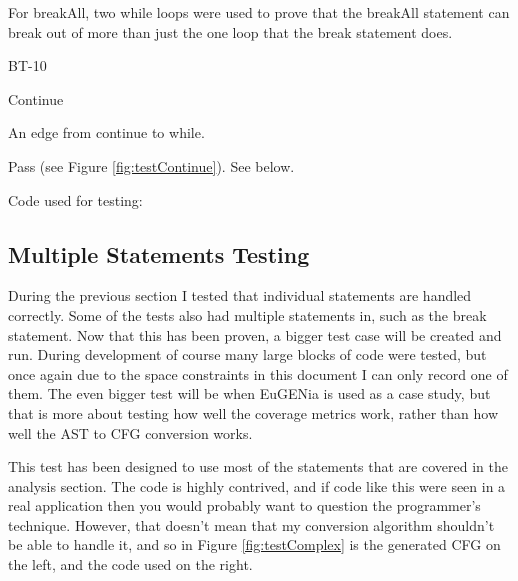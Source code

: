 For breakAll, two while loops were used to prove that the breakAll statement can break out of more than just the one loop that the break statement does.

\begin{minipage}{.6\textwidth}
\begin{description}[style=sameline,leftmargin=4.5cm,nolistsep]
\item[\hspace*{0.3cm}Label] BT-10
\item[\hspace*{0.3cm}Statement under Test] Continue
\item[\hspace*{0.3cm}Expected Output] An edge from continue to while.
\item[\hspace*{0.3cm}Result] Pass (see Figure \ref{fig:testContinue}). See below.
\end{description}
\end{minipage}
\begin{minipage}{.1\textwidth}
\hspace{1.0mm}
\end{minipage}
\begin{minipage}{.29\textwidth}
  \centering
  Code used for testing:
  
\end{minipage}

\subsection{Multiple Statements Testing}

During the previous section I tested that individual statements are handled correctly. Some of the tests also had multiple statements in, such as the break statement. Now that this has been proven, a bigger test case will be created and run. During development of course many large blocks of code were tested, but once again due to the space constraints in this document I can only record one of them. The even bigger test will be when EuGENia is used as a case study, but that is more about testing how well the coverage metrics work, rather than how well the AST to CFG conversion works.

This test has been designed to use most of the statements that are covered in the analysis section. The code is highly contrived, and if code like this were seen in a real application then you would probably want to question the programmer's technique. However, that doesn't mean that my conversion algorithm shouldn't be able to handle it, and so in Figure \ref{fig:testComplex} is the generated CFG on the left, and the code used on the right.

